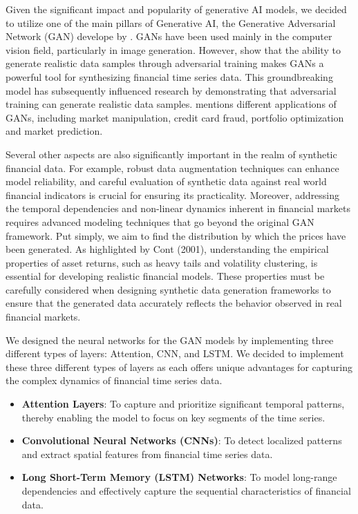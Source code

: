 \documentclass{article}
\begin{document}
Given the significant impact and popularity of generative AI models, we decided to utilize one of the main pillars of Generative AI, the Generative Adversarial Network (GAN) develope by \textcite{goodfellow_generative_2014}. GANs have been used mainly in the computer vision field, particularly in image generation. However, \textcite{iglesias_survey_2023} show that the ability to generate realistic data samples through adversarial training makes GANs a powerful tool for synthesizing financial time series data. This groundbreaking model has subsequently influenced research by demonstrating that adversarial training can generate realistic data samples. \textcite{EckerliFlorian2021GANi} mentions different applications of GANs, including market manipulation, credit card fraud, portfolio optimization and market prediction.

Several other aspects are also significantly important in the realm of synthetic financial data. For example, robust data augmentation techniques can enhance model reliability, and careful evaluation of synthetic data against real world financial indicators is crucial for ensuring its practicality. Moreover, addressing the temporal dependencies and non-linear dynamics inherent in financial markets requires advanced modeling techniques that go beyond the original GAN framework. Put simply, we aim to find the distribution by which the prices have been generated. As highlighted by Cont (2001), understanding the empirical properties of asset returns, such as heavy tails and volatility clustering, is essential for developing realistic financial models. These properties must be carefully considered when designing synthetic data generation frameworks to ensure that the generated data accurately reflects the behavior observed in real financial markets.

We designed the neural networks for the GAN models by implementing three different types of layers: Attention, CNN, and LSTM. We decided to implement these three different types of layers as each offers unique advantages for capturing the complex dynamics of financial time series data.

\begin{itemize}
    \item \textbf{Attention Layers}: To capture and prioritize significant temporal patterns, thereby enabling the model to focus on key segments of the time series.
    \item \textbf{Convolutional Neural Networks (CNNs)}: To detect localized patterns and extract spatial features from financial time series data.
    \item \textbf{Long Short-Term Memory (LSTM) Networks}: To model long-range dependencies and effectively capture the sequential characteristics of financial data.
\end{itemize}
\end{document}
